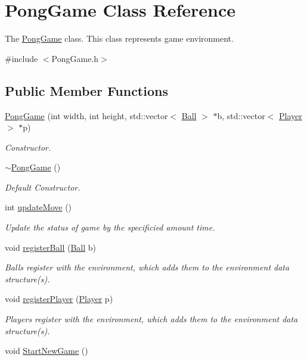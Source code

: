 \hypertarget{classPongGame}{\section{Pong\+Game Class Reference}
\label{classPongGame}
}


The \hyperlink{classPongGame}{Pong\+Game} class. This class represents game environment.  




{\ttfamily \#include $<$Pong\+Game.\+h$>$}

\subsection*{Public Member Functions}
\begin{DoxyCompactItemize}
\item 
\hyperlink{classPongGame_ab43c680542f00834d51ad75da21e5b4f}{Pong\+Game} (int width, int height, std\+::vector$<$ \hyperlink{classBall}{Ball} $>$ $\ast$b, std\+::vector$<$ \hyperlink{classPlayer}{Player} $>$ $\ast$p)
\begin{DoxyCompactList}\small\item\em Constructor. \end{DoxyCompactList}\item 
\hypertarget{classPongGame_afb95a66cbc5618ca9c73476f8c51ab94}{\hyperlink{classPongGame_afb95a66cbc5618ca9c73476f8c51ab94}{$\sim$\+Pong\+Game} ()}\label{classPongGame_afb95a66cbc5618ca9c73476f8c51ab94}

\begin{DoxyCompactList}\small\item\em Default Constructor. \end{DoxyCompactList}\item 
int \hyperlink{classPongGame_ad5ced36934c6597e1ba0603108953826}{update\+Move} ()
\begin{DoxyCompactList}\small\item\em Update the status of game by the specificied amount time. \end{DoxyCompactList}\item 
void \hyperlink{classPongGame_a10d3179a962692fef5bda0dc9927d368}{register\+Ball} (\hyperlink{classBall}{Ball} b)
\begin{DoxyCompactList}\small\item\em Balls register with the environment, which adds them to the environment data structure(s). \end{DoxyCompactList}\item 
void \hyperlink{classPongGame_a8372b9946c95954b35fcf4c3543c11c2}{register\+Player} (\hyperlink{classPlayer}{Player} p)
\begin{DoxyCompactList}\small\item\em Players register with the environment, which adds them to the environment data structure(s). \end{DoxyCompactList}\item 
\hypertarget{classPongGame_a911a5071f520fd9989b9b4de2039c982}{void \hyperlink{classPongGame_a911a5071f520fd9989b9b4de2039c982}{Start\+New\+Game} ()}\label{classPongGame_a911a5071f520fd9989b9b4de2039c982}


\end{DoxyCompactItemize}
